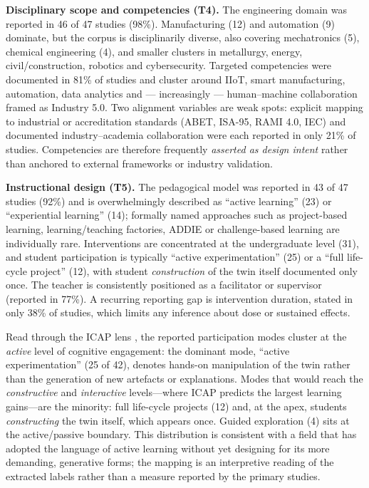 \textbf{Disciplinary scope and competencies (T4).} The engineering domain was
reported in 46 of 47 studies (98\%). Manufacturing (12) and automation (9)
dominate, but the corpus is disciplinarily diverse, also covering mechatronics
(5), chemical engineering (4), and smaller clusters in metallurgy, energy,
civil/construction, robotics and cybersecurity. Targeted competencies were
documented in 81\% of studies and cluster around IIoT, smart manufacturing,
automation, data analytics and --- increasingly --- human--machine collaboration
framed as Industry 5.0. Two alignment variables are weak spots: explicit mapping
to industrial or accreditation standards (ABET, ISA-95, RAMI 4.0, IEC) and
documented industry--academia collaboration were each reported in only 21\% of
studies. Competencies are therefore frequently \emph{asserted as design intent}
rather than anchored to external frameworks or industry validation.

\textbf{Instructional design (T5).} The pedagogical model was reported in 43 of 47
studies (92\%) and is overwhelmingly described as ``active learning'' (23) or
``experiential learning'' (14); formally named approaches such as project-based
learning, learning/teaching factories, ADDIE or challenge-based learning are
individually rare. Interventions are concentrated at the undergraduate level
(31), and student participation is typically ``active experimentation'' (25) or a
``full life-cycle project'' (12), with student \emph{construction} of the twin itself
documented only once. The teacher is consistently positioned as a facilitator or
supervisor (reported in 77\%). A recurring reporting gap is intervention
duration, stated in only 38\% of studies, which limits any inference about dose
or sustained effects.

Read through the ICAP lens \citep{chi_icap_2014}, the reported participation modes
cluster at the \emph{active} level of cognitive engagement: the dominant mode, ``active
experimentation'' (25 of 42), denotes hands-on manipulation of the twin rather than
the generation of new artefacts or explanations. Modes that would reach the
\emph{constructive} and \emph{interactive} levels---where ICAP predicts the largest learning
gains---are the minority: full life-cycle projects (12) and, at the apex, students
\emph{constructing} the twin itself, which appears once. Guided exploration (4) sits at
the active/passive boundary. This distribution is consistent with a field that has
adopted the language of active learning \citep{prince_does_2004, freeman_active_2014}
without yet designing for its more demanding, generative forms; the mapping is an
interpretive reading of the extracted labels rather than a measure reported by the
primary studies.


